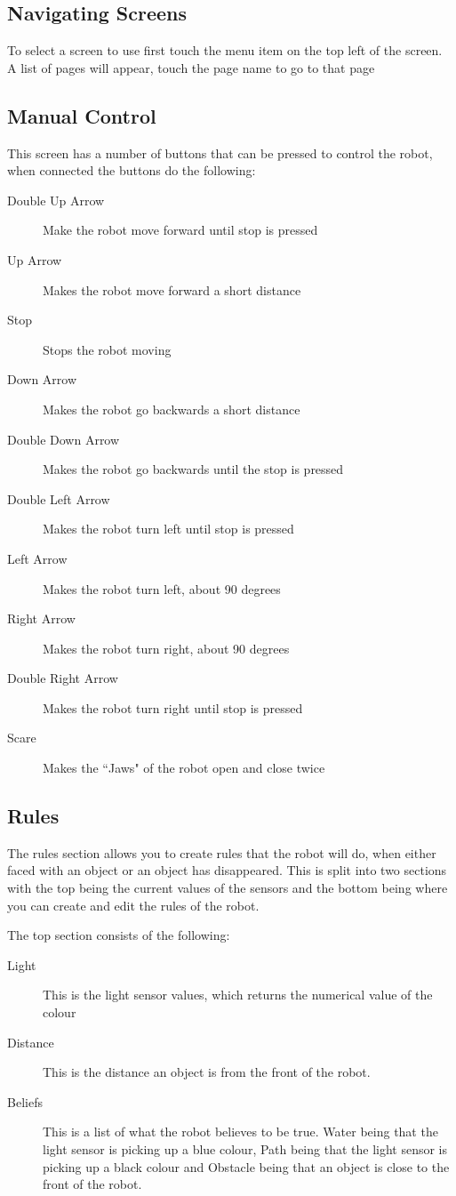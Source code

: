 \documentclass[]{article}   	%
\begin{document}
{\subsection{Navigating Screens}
\par{To select a screen to use first touch the menu item on the top left of the screen. A list of pages will appear, touch the page name to go to that page}
\subsection{Manual Control}
\par{This screen has a number of buttons that can be pressed to control the robot, when connected the buttons do the following: 
\begin{description}
	\item[Double Up Arrow] Make the robot move forward until stop is pressed
	\item[Up Arrow] Makes the robot move forward a short distance
	\item[Stop] Stops the robot moving
	\item[Down Arrow] Makes the robot go backwards a short distance
	\item[Double Down Arrow] Makes the robot go backwards until the stop is pressed
	\item[Double Left Arrow] Makes the robot turn left until stop is pressed
	\item[Left Arrow] Makes the robot turn left, about 90 degrees
	\item[Right Arrow] Makes the robot turn right, about 90 degrees
	\item[Double Right Arrow] Makes the robot turn right until stop is pressed
	\item[Scare] Makes the ``Jaws" of the robot open and close twice
\end{description}
}

\subsection{Rules}
\par{The rules section allows you to create rules that the robot will do, when either faced with an object or an object has disappeared. This is split into two sections with the top being the current values of the sensors and the bottom being where you can create and edit the rules of the robot.}
\par{The top section consists of the following:
\begin{description}
\item[Light]This is the light sensor values, which returns the numerical value of the colour
\item[Distance]This is the distance an object is from the front of the robot.
\item[Beliefs]This is a list of what the robot believes to be true. Water being that the light sensor is picking up a blue colour, Path being that the light sensor is picking up a black colour and Obstacle being that an object is close to the front of the robot.
\end{description}
}

}
\end{document}
